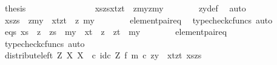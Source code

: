 \begin{isabellebody}
\ {\isacharquery}{\kern0pt}thesis\isacommand{{\isachardot}{\kern0pt}}\isamarkupfalse%
\isanewline
\ \ \ \ \isamarkupfalse%
\ \ \ \isanewline
\ \ \ \ \isamarkupfalse%
\ \isamarkupfalse%
\ {\isachardoublequoteopen}{\isasymlangle}{\isasymlangle}xs{\isacharcomma}{\kern0pt}zs{\isasymrangle}{\isacharcomma}{\kern0pt}{\isasymlangle}xt{\isacharcomma}{\kern0pt}zt{\isasymrangle}{\isasymrangle}\ {\isacharequal}{\kern0pt}\ {\isasymlangle}{\isasymlangle}z{\isacharcomma}{\kern0pt}my{}{\isasymrangle}{\isacharcomma}{\kern0pt}{\isasymlangle}z{\isacharcomma}{\kern0pt}my{}{\isasymrangle}{\isasymrangle}{\isachardoublequoteclose}\isanewline
\ \ \ \ \ \ \isamarkupfalse%
\ zy{\isacharunderscore}{\kern0pt}def\ \isamarkupfalse%
\ auto\isanewline
\ \ \ \ \isamarkupfalse%
\ \isamarkupfalse%
\ {\isachardoublequoteopen}{\isasymlangle}xs{\isacharcomma}{\kern0pt}zs{\isasymrangle}\ {\isacharequal}{\kern0pt}\ {\isasymlangle}z{\isacharcomma}{\kern0pt}my{}{\isasymrangle}\ {\isasymand}\ {\isasymlangle}xt{\isacharcomma}{\kern0pt}zt{\isasymrangle}\ {\isacharequal}{\kern0pt}\ {\isasymlangle}z{\isacharcomma}{\kern0pt}\ my{}{\isasymrangle}{\isachardoublequoteclose}\isanewline
\ \ \ \ \ \ \isamarkupfalse%
\ element{\isacharunderscore}{\kern0pt}pair{\isacharunderscore}{\kern0pt}eq\ \isamarkupfalse%
\ {\isacharparenleft}{\kern0pt}typecheck{\isacharunderscore}{\kern0pt}cfuncs{\isacharcomma}{\kern0pt}\ auto{\isacharparenright}{\kern0pt}\isanewline
\ \ \ \ \isamarkupfalse%
\ \isamarkupfalse%
\ eqs{\isacharcolon}{\kern0pt}\ {\isachardoublequoteopen}xs\ {\isacharequal}{\kern0pt}\ z\ {\isasymand}\ zs\ {\isacharequal}{\kern0pt}\ my{}\ {\isasymand}\ xt\ {\isacharequal}{\kern0pt}\ z\ {\isasymand}\ zt\ {\isacharequal}{\kern0pt}\ my{}{\isachardoublequoteclose}\isanewline
\ \ \ \ \ \ \isamarkupfalse%
\ element{\isacharunderscore}{\kern0pt}pair{\isacharunderscore}{\kern0pt}eq\ \isamarkupfalse%
\ {\isacharparenleft}{\kern0pt}typecheck{\isacharunderscore}{\kern0pt}cfuncs{\isacharcomma}{\kern0pt}\ auto{\isacharparenright}{\kern0pt}\isanewline
\isanewline
\ \ \ \ \isamarkupfalse%
\ {\isachardoublequoteopen}{\isacharparenleft}{\kern0pt}distribute{\isacharunderscore}{\kern0pt}left\ Z\ X\ X\ \ {\isasymcirc}\isactrlsub c\ {\isacharparenleft}{\kern0pt}id\isactrlsub c\ Z\ {\isasymtimes}\isactrlsub f\ m{\isacharparenright}{\kern0pt}{\isacharparenright}{\kern0pt}\ {\isasymcirc}\isactrlsub c\ {\isasymlangle}z{\isacharcomma}{\kern0pt}y{\isacharprime}{\kern0pt}{\isasymrangle}\ {\isacharequal}{\kern0pt}\ {\isasymlangle}{\isasymlangle}xt{\isacharcomma}{\kern0pt}zt{\isasymrangle}{\isacharcomma}{\kern0pt}\ {\isasymlangle}xs{\isacharcomma}{\kern0pt}zs{\isasymrangle}{\isasymrangle}{\isachardoublequoteclose}\isanewline

\end{isabellebody}
